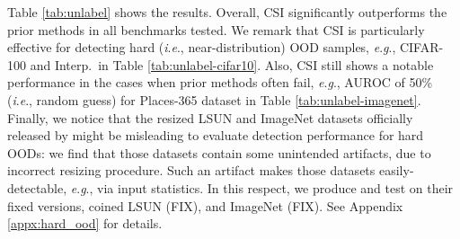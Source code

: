 \documentclass{article}
\newcommand{\ie}{\textit{i}.\textit{e}.}
\newcommand{\eg}{\textit{e}.\textit{g}.}
\begin{document}
Table \ref{tab:unlabel} shows the results. Overall, CSI significantly outperforms the prior methods in all benchmarks tested.  We remark that CSI is particularly effective  for detecting hard (\ie, near-distribution) OOD samples, \eg, CIFAR-100 and Interp.~in Table \ref{tab:unlabel-cifar10}. Also, CSI still shows a notable performance in the cases when prior methods often fail, \eg, AUROC of 50\% (\ie, random guess) for Places-365 dataset in Table \ref{tab:unlabel-imagenet}. Finally, we notice that the resized LSUN and ImageNet datasets officially released by \citet{liang2018enhancing} might be misleading to evaluate detection performance for hard OODs: we find that those datasets contain some unintended artifacts, due to incorrect resizing procedure. Such an artifact makes those datasets easily-detectable, \eg, via input statistics. In this respect, we produce and test on their fixed versions, coined LSUN (FIX), and ImageNet (FIX). See Appendix \ref{appx:hard_ood} for details.
\end{document}

